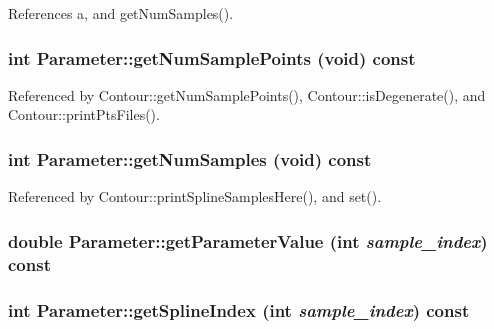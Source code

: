References a, and getNumSamples().\hypertarget{classParameter_e6a494adb7a970b6d9a1d6c242f600e6}{
\subsubsection[getNumSamplePoints]{\setlength{\rightskip}{0pt plus 5cm}int Parameter::getNumSamplePoints (void) const}}
\label{classParameter_e6a494adb7a970b6d9a1d6c242f600e6}




Referenced by Contour::getNumSamplePoints(), Contour::isDegenerate(), and Contour::printPtsFiles().\hypertarget{classParameter_51f0d8dc2f9c7c113be49351118902e2}{
\subsubsection[getNumSamples]{\setlength{\rightskip}{0pt plus 5cm}int Parameter::getNumSamples (void) const}}
\label{classParameter_51f0d8dc2f9c7c113be49351118902e2}




Referenced by Contour::printSplineSamplesHere(), and set().\hypertarget{classParameter_2f0b21ed83fb3a11305ee733a34317b2}{
\subsubsection[getParameterValue]{\setlength{\rightskip}{0pt plus 5cm}double Parameter::getParameterValue (int {\em sample\_\-index}) const}}
\label{classParameter_2f0b21ed83fb3a11305ee733a34317b2}


\hypertarget{classParameter_3f630390b0346479113e758df49ad21d}{
\subsubsection[getSplineIndex]{\setlength{\rightskip}{0pt plus 5cm}int Parameter::getSplineIndex (int {\em sample\_\-index}) const}}
\label{classParameter_3f630390b0346479113e758df49ad21d}


